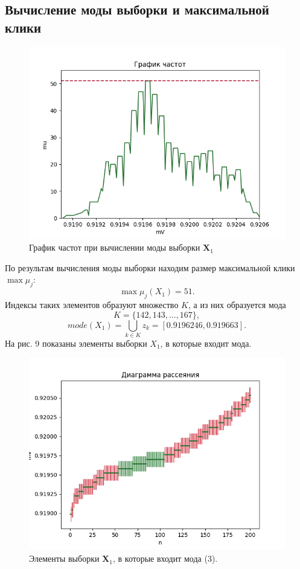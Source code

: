 \documentclass{article}
\begin{document}
\subsection{Вычисление моды выборки и максимальной клики}
\begin{figure}[H]
            \centering
		\includegraphics[width = 160 mm, height = 120 mm]{result3.png}
		\caption{График частот при вычислении моды выборки $\textbf{X}_1$}
		\label{fig:six}
\end{figure}
По результам вычисления моды выборки находим размер максимальной клики $\max\mu_j$:
$$\max\mu_j(X_1) = 51.$$
Индексы таких элементов образуют множество $K$, а из них образуется
мода
$$ K = \{142, 143, ..., 167\},$$
$$ mode(X_1) = \bigcup\limits_{k\in K} z_k = [0.9196246, 0.919663].$$
На рис. 9 показаны элементы выборки $X_1$, в которые входит мода.
\begin{figure}[H]
            \centering
		\includegraphics[width = 160 mm, height = 120 mm]{result4.png}
		\caption{Элементы выборки $\textbf{X}_1$, в которые входит мода (3).}
		\label{fig:six}
\end{figure}
\end{document}
